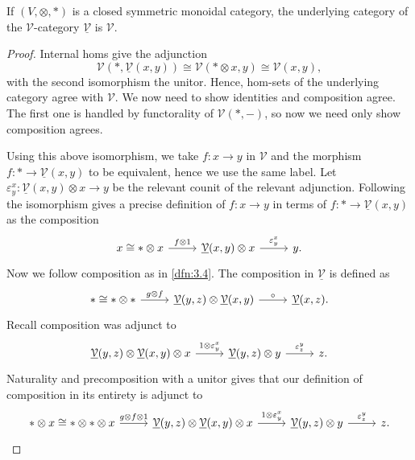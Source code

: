 \begin{lemma}\label{lma:3.3}
	If $(V,\otimes ,*)$ is a closed symmetric monoidal category, the underlying category of the $\mathcal{V} $-category $\underline{\mathcal{V} } $ is $\mathcal{V} $.
\end{lemma}
\begin{proof}
	Internal homs give the adjunction
	\[
		\mathcal{V} (*,\underline{\mathcal{V} } (x,y))\cong \mathcal{V} (*\otimes x,y)\cong \mathcal{V} (x,y)
	,\]
	with the second isomorphism the unitor. Hence, hom-sets of the underlying category agree with $\mathcal{V} $. We now need to show identities and composition agree. The first one is handled by functorality of $\mathcal{V} (*,-)$, so now we need only show composition agrees.

	Using this above isomorphism, we take $f : x \to y$ in $\mathcal{V} $ and the morphism $f : * \to \underline{\mathcal{V} } (x,y)$ to be equivalent, hence we use the same label. Let $\varepsilon _y^x : \underline{\mathcal{V} } (x,y)\otimes x \to y$ be the relevant counit of the relevant adjunction. Following the isomorphism gives a precise definition of $f : x \to y$ in terms of $f : * \to \underline{\mathcal{V} } (x,y)$ as the composition
	\[\begin{tikzcd}[row sep = 2.5em, column sep = 2.5em]
		x\cong *\otimes x \ar[" f\otimes 1 ", r]  & \underline{\mathcal{V} } (x,y)\otimes x\ar[" \varepsilon _y^x ", r]  & y.
	\end{tikzcd}\]
	Now we follow composition as in \cref{dfn:3.4}. The composition in $\underline{\mathcal{V} } $ is defined as
	\[\begin{tikzcd}[row sep = 2.5em, column sep = 2.5em]
	*\cong *\otimes *\ar[" g\otimes f ", r]  & \underline{\mathcal{V} } (y,z)\otimes \underline{\mathcal{V} } (x,y)\ar[" \circ  ", r]  & \underline{\mathcal{V} } (x,z).
	\end{tikzcd}\]
	Recall composition was adjunct to
	\[\begin{tikzcd}[row sep = 2.5em, column sep = 2.5em]
		\underline{\mathcal{V} } (y,z)\otimes \underline{\mathcal{V} } (x,y)\otimes x\ar[" 1\otimes \varepsilon _y^x ", r]&  \underline{\mathcal{V} } (y,z)\otimes y\ar[" \varepsilon _z^y ", r]  & z .
	\end{tikzcd}\]
	Naturality and precomposition with a unitor gives that our definition of composition in its entirety is adjunct to
	\[\begin{tikzcd}[row sep = 2.5em, column sep = 2.5em]
	*\otimes x\cong *\otimes *\otimes x\ar[" g\otimes f\otimes 1 ", r]  & \underline{\mathcal{V} } (y,z)\otimes \underline{\mathcal{V} } (x,y)\otimes x\ar[" 1\otimes \varepsilon _y^x ", r]  & \underline{\mathcal{V} } (y,z)\otimes y\ar[" \varepsilon _z^y ", r]  & z.

\end{tikzcd}\]
\end{proof}
